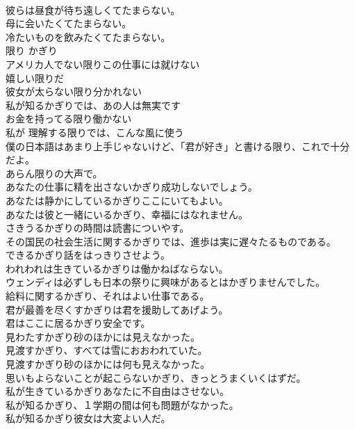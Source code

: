 \documentclass[8pt]{extreport}
\begin{document}
\begin{CJK}{UTF8}{min}
\\	彼らは昼食が待ち遠しくてたまらない。  
\\	母に会いたくてたまらない。  
\\	冷たいものを飲みたくてたまらない。  
\\	限り	かぎり	
\\	アメリカ人でない限りこの仕事には就けない  
\\	嬉しい限りだ  
\\	彼女が太らない限り分かれない  
\\	私が知るかぎりでは、あの人は無実です  
\\	お金を持ってる限り働かない  
\\	私が 理解する限りでは、こんな風に使う  
\\	僕の日本語はあまり上手じゃないけど、「君が好き」と書ける限り、これで十分だよ。  
\\	あらん限りの大声で。  
\\	あなたの仕事に精を出さないかぎり成功しないでしょう。   
\\	あなたは静かにしているかぎりここにいてもよい。   
\\	あなたは彼と一緒にいるかぎり、幸福にはなれません。   
\\	さきうるかぎりの時間は読書についやす。   
\\	その国民の社会生活に関するかぎりでは、進歩は実に遅々たるものである。   
\\	できるかぎり話をはっきりさせよう。   
\\	われわれは生きているかぎりは働かねばならない。   
\\	ウェンディは必ずしも日本の祭りに興味があるとはかぎりませんでした。   
\\	給料に関するかぎり、それはよい仕事である。   
\\	君が最善を尽くすかぎりは君を援助してあげよう。   
\\	君はここに居るかぎり安全です。   
\\	見わたすかぎり砂のほかには見えなかった。   
\\	見渡すかぎり、すべては雪におおわれていた。   
\\	見渡すかぎり砂のほかには何も見えなかった。   
\\	思いもよらないことが起こらないかぎり、きっとうまくいくはずだ。   
\\	私が生きているかぎりあなたに不自由はさせない。   
\\	私が知るかぎり、１学期の間は何も問題がなかった。   
\\	私が知るかぎり彼女は大変よい人だ。   

\end{CJK}
\end{document}
